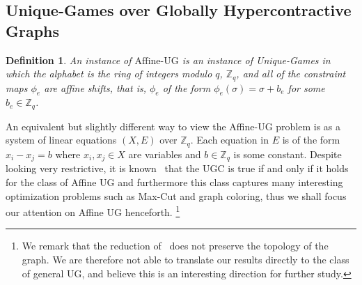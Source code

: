 \documentclass[11pt]{article}
\newtheorem{definition}[theorem]{Definition}
\theoremstyle{definition}
\begin{document}
\subsection{Unique-Games over Globally Hypercontractive Graphs}
\begin{definition}
An instance of $\text{Affine-UG}$ is an instance of Unique-Games 
in which the alphabet is the ring of integers modulo $q$, $\mathbb{Z}_q$, and all of the 
constraint maps $\phi_e$ are affine shifts, that is, $\phi_e$ 
of the form $\phi_e(\sigma) = \sigma+b_e$ for some $b_e\in\mathbb{Z}_q$.
\end{definition}
An equivalent but slightly different way to view 
the Affine-UG problem is as a system
of linear equations $(X,E)$ over $\mathbb{Z}_q$.  
Each equation in $E$ is of the form $x_i - x_j = b$ where $x_i,x_j\in X$ are variables 
and $b\in\mathbb{Z}_q$ is some constant. Despite looking very restrictive, 
it is known~\cite{KhotKMO07} that the UGC is true if and 
only if it holds for the class of Affine UG and furthermore this class captures many interesting optimization problems such as Max-Cut and graph coloring, thus we shall focus our attention on Affine UG henceforth. 
\footnote{We remark that the 
reduction of~\cite{KhotKMO07} does not preserve the topology of the graph. 
We are therefore not able to translate our results directly to the 
class of general UG, and believe this is an interesting direction 
for further study.}
\end{document}
